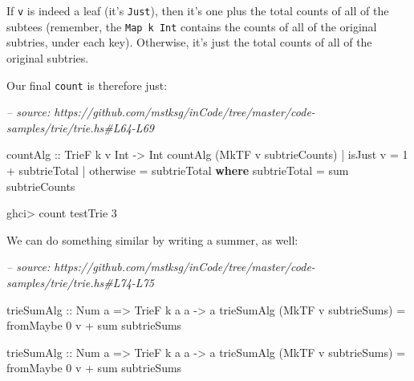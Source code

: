 \documentclass[]{article}
\newenvironment{Shaded}{}{}
\newcommand{\CommentTok}[1]{\textcolor[rgb]{0.38,0.63,0.69}{\textit{#1}}}
\newcommand{\DataTypeTok}[1]{\textcolor[rgb]{0.56,0.13,0.00}{#1}}
\newcommand{\DecValTok}[1]{\textcolor[rgb]{0.25,0.63,0.44}{#1}}
\newcommand{\FunctionTok}[1]{\textcolor[rgb]{0.02,0.16,0.49}{#1}}
\newcommand{\KeywordTok}[1]{\textcolor[rgb]{0.00,0.44,0.13}{\textbf{#1}}}
\newcommand{\NormalTok}[1]{#1}
\newcommand{\OtherTok}[1]{\textcolor[rgb]{0.00,0.44,0.13}{#1}}
\begin{document}
If \texttt{v} is indeed a leaf (it's \texttt{Just}), then it's one plus the
total counts of all of the subtees (remember, the \texttt{Map\ k\ Int} contains
the counts of all of the original subtries, under each key). Otherwise, it's
just the total counts of all of the original subtries.

Our final \texttt{count} is therefore just:

\begin{Shaded}
\begin{Highlighting}[]
\CommentTok{-- source: https://github.com/mstksg/inCode/tree/master/code-samples/trie/trie.hs#L64-L69}

\OtherTok{countAlg ::} \DataTypeTok{TrieF}\NormalTok{ k v }\DataTypeTok{Int} \OtherTok{->} \DataTypeTok{Int}
\NormalTok{countAlg (}\DataTypeTok{MkTF}\NormalTok{ v subtrieCounts)}
    \FunctionTok{|}\NormalTok{ isJust v  }\FunctionTok{=} \DecValTok{1} \FunctionTok{+}\NormalTok{ subtrieTotal}
    \FunctionTok{|}\NormalTok{ otherwise }\FunctionTok{=}\NormalTok{ subtrieTotal}
  \KeywordTok{where}
\NormalTok{    subtrieTotal }\FunctionTok{=}\NormalTok{ sum subtrieCounts}
\end{Highlighting}
\end{Shaded}

\begin{Shaded}
\begin{Highlighting}[]
\NormalTok{ghci}\FunctionTok{>}\NormalTok{ count testTrie}
\DecValTok{3}
\end{Highlighting}
\end{Shaded}

We can do something similar by writing a summer, as well:

\begin{Shaded}
\begin{Highlighting}[]
\CommentTok{-- source: https://github.com/mstksg/inCode/tree/master/code-samples/trie/trie.hs#L74-L75}

\OtherTok{trieSumAlg ::} \DataTypeTok{Num}\NormalTok{ a }\OtherTok{=>} \DataTypeTok{TrieF}\NormalTok{ k a a }\OtherTok{->}\NormalTok{ a}
\NormalTok{trieSumAlg (}\DataTypeTok{MkTF}\NormalTok{ v subtrieSums) }\FunctionTok{=}\NormalTok{ fromMaybe }\DecValTok{0}\NormalTok{ v }\FunctionTok{+}\NormalTok{ sum subtrieSums}

\OtherTok{trieSumAlg ::} \DataTypeTok{Num}\NormalTok{ a }\OtherTok{=>} \DataTypeTok{TrieF}\NormalTok{ k a a }\OtherTok{->}\NormalTok{ a}
\NormalTok{trieSumAlg (}\DataTypeTok{MkTF}\NormalTok{ v subtrieSums) }\FunctionTok{=}\NormalTok{ fromMaybe }\DecValTok{0}\NormalTok{ v }\FunctionTok{+}\NormalTok{ sum subtrieSums}
\end{Highlighting}
\end{Shaded}
\end{document}
